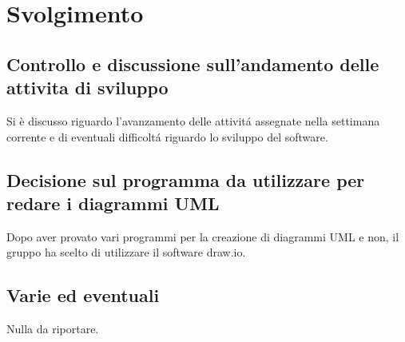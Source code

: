 \newpage
\section*{Svolgimento}

	\subsection*{Controllo e discussione sull'andamento delle attivita di sviluppo}
		Si è discusso riguardo l'avanzamento delle attivitá assegnate nella settimana corrente e di eventuali difficoltá riguardo lo sviluppo del software.

	\subsection*{Decisione sul programma da utilizzare per redare i diagrammi UML}
		Dopo aver provato vari programmi per la creazione di diagrammi UML e non, il gruppo ha scelto di utilizzare il software draw.io.

	\subsection*{Varie ed eventuali}
		Nulla da riportare.
